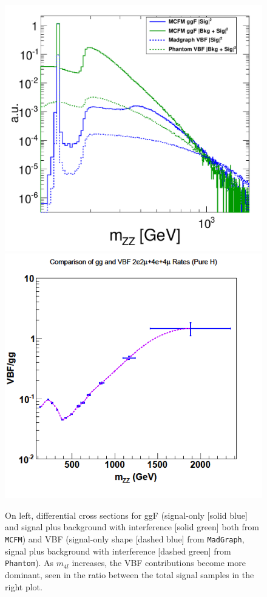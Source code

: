 \begin{figure}[htbp]
\begin{center}
\includegraphics[width=.45\linewidth]{HiggsProperties/figures/ggFvVBF_log_fix.eps}
\includegraphics[width=.45\linewidth]{HiggsProperties/figures/vbf2.png}
\caption[Comparisons Between VBF and ggF Productions for Off-Shell Region]{On left, differential cross sections for ggF (signal-only [solid blue] and signal plus background with interference [solid green] both from {\tt MCFM}) and VBF (signal-only shape [dashed blue] from {\tt MadGraph}, signal plus background with interference [dashed green] from {\tt Phantom}). As $m_{4l}$ increases, the VBF contributions become more dominant, seen in the ratio between the total signal samples in the right plot.}
\label{fig:VBFvggF_OffShell}
\end{center}
\end{figure}

